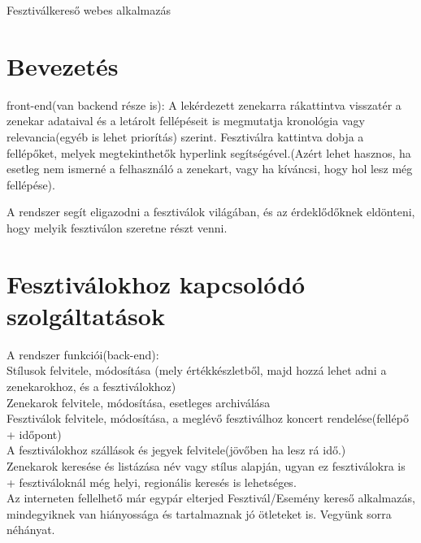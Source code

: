 \documentclass[11pt]{article}
\begin{document}
\begin{center}
\huge Fesztiválkereső webes alkalmazás
\end{center}

\section*{Bevezetés}

front-end(van backend része is):
A lekérdezett zenekarra rákattintva visszatér a zenekar adataival és a letárolt fellépéseit is megmutatja kronológia vagy relevancia(egyéb is lehet priorítás) szerint.
Fesztiválra kattintva dobja a fellépőket, melyek megtekinthetők hyperlink segítségével.(Azért lehet hasznos, ha esetleg nem ismerné a felhasználó a zenekart, vagy ha kíváncsi, hogy hol lesz még fellépése).

A rendszer segít eligazodni a fesztiválok világában, és az érdeklődőknek eldönteni, hogy melyik fesztiválon szeretne részt venni.


\section{Fesztiválokhoz kapcsolódó szolgáltatások}


A rendszer funkciói(back-end):\\
Stílusok felvitele, módosítása (mely értékkészletből, majd hozzá lehet adni a zenekarokhoz, és a fesztiválokhoz)\\
Zenekarok felvitele, módosítása, esetleges archiválása\\
Fesztiválok felvitele, módosítása, a meglévő fesztiválhoz koncert rendelése(fellépő + időpont)\\
A fesztiválokhoz szállások és jegyek felvitele(jövőben ha lesz rá idő.)\\
Zenekarok keresése és listázása név vagy stílus alapján, ugyan ez fesztiválokra is + fesztiváloknál még helyi, regionális keresés is lehetséges.\\


Az interneten fellelhető már egypár elterjed Fesztivál/Esemény kereső alkalmazás, mindegyiknek van hiányossága és tartalmaznak jó ötleteket is. Vegyünk sorra néhányat.
\end{document}
